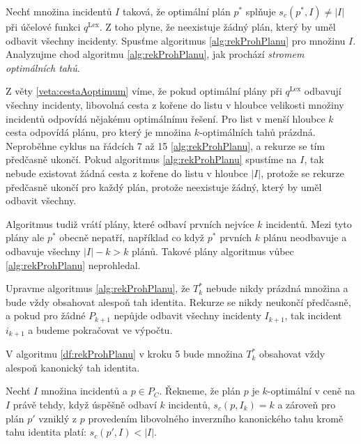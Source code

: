 Nechť množina incidentů $I$ taková, že optimální plán $p^*$ splňuje $s_c(p^*, I) \neq |I|$ při účelové funkci $q^{\text{Lex}}$.
Z toho plyne, že neexistuje žádný plán, který by uměl odbavit všechny incidenty.
Spusťme algoritmus \ref{alg:rekProhPlanu} pro množinu $I$.
Analyzujme chod algoritmu \ref{alg:rekProhPlanu}, jak prochází \textit{stromem optimálních tahů}.

Z věty \ref{veta:cestaAoptimum} víme, že pokud optimální plány při $q^{\text{Lex}}$ odbavují všechny incidenty, libovolná 
cesta z kořene do listu v hloubce velikosti množiny incidentů odpovídá nějakému optimálnímu řešení.
Pro list v menší hloubce $k$ cesta odpovídá plánu, pro který je množina $k$-optimálních tahů prázdná.
Neproběhne cyklus na řádcích 7 až 15 \ref{alg:rekProhPlanu}, a rekurze se tím předčasně ukončí.
Pokud algoritmus \ref{alg:rekProhPlanu} spustíme na $I$, tak nebude existovat žádná cesta z kořene do listu v hloubce $|I|$, protože se rekurze předčasně ukončí pro každý plán,
protože neexistuje žádný, který by uměl odbavit všechny.

Algoritmus tudiž vrátí plány, které odbaví prvních nejvíce $k$ incidentů.
Mezi tyto plány ale $p^*$ obecně nepatří, například co když $p^*$ prvních $k$ plánu neodbavuje a odbavuje všechny $|I| - k > k$ plánů. 
Takové plány algoritmus vůbec \ref{alg:rekProhPlanu} neprohledal.

Upravme algoritmus \ref{alg:rekProhPlanu}, že $T^*_k$ nebude nikdy prázdná množina a bude vždy obsahovat alespoň tah identita. 
Rekurze se nikdy neukončí předčasně, a pokud pro žádné $P_{k+1}$ nepůjde odbavit všechny incidenty $I_{k+1}$, tak incident $i_{k+1}$  a budeme pokračovat ve výpočtu.

\begin{definice}\label{df:upravenyAlg}
  V algoritmu \ref{df:rekProhPlanu} v kroku 5 bude množina $T^*_k$ obsahovat vždy alespoň kanonický tah identita.
\end{definice}

\begin{definice}
  Nechť $I$ množina incidentů a $p \in P_C$.
  Řekneme, že plán $p$ je $k$-optimální v ceně na $I$ právě tehdy, když úspěšně odbaví $k$ incidentů, $s_c(p, I_k) = k$ a zároveň
  pro plán $p'$ vzniklý z $p$ provedením libovolného inverzního kanonického tahu kromě tahu identita platí: $s_c(p', I) < |I|$.
\end{definice}

